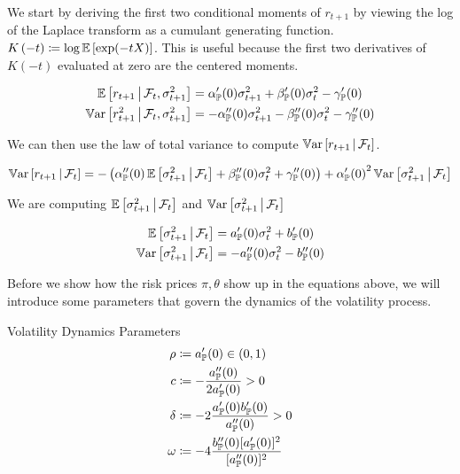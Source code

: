 \documentclass[11pt, letterpaper, twoside, final]{article}
\begin{document}
We start by deriving the first two conditional moments of $r_{t+1}$ by viewing the log of the Laplace transform as
a cumulant generating function.
$K\left(-t \right) \coloneqq \log \operatorname{\mathbb{E}}\left[\exp(-t X) \right]$. 
This is useful because the first two derivatives of $K(-t)$ evaluated at zero are the centered moments.

\begin{align}
    \operatorname{\mathbb{E}}\left[r_{t+1} \,\middle\vert\, \mathcal{F}_t, \sigma^2_{t+1}\right]  &= \alpha_{\mathbb{P}}'(0) \sigma^2_{t+1}  + \beta_{\mathbb{P}}'(0)
    \sigma^2_{t} - \gamma_{\mathbb{P}}'(0) \\
    \operatorname{\mathbb{V}ar}\left[r_{t+1}^2 \,\middle\vert\, \mathcal{F}_t, \sigma^2_{t+1}\right]  &= -\alpha_{\mathbb{P}}''(0) \sigma^2_{t+1}  -
    \beta_{\mathbb{P}}''(0) \sigma^2_{t} - \gamma_{\mathbb{P}}''(0)
\end{align}

We can then use the law of total variance to compute $\operatorname{\mathbb{V}ar}\left[r_{t+1} \,\middle\vert\, \mathcal{F}_t\right]$.

\begin{equation}
    \operatorname{\mathbb{V}ar}\left[r_{t+1} \,\middle\vert\, \mathcal{F}_t\right]  = -\left( \alpha_{\mathbb{P}}''(0) \operatorname{\mathbb{E}} \left[\sigma^2_{t+1} \,\middle\vert\, \mathcal{F}_t \right]
    + \beta_{\mathbb{P}}''(0) \sigma^2_{t} + \gamma_{\mathbb{P}}''(0)\right) + {\alpha_{\mathbb{P}}'(0)}^2 \operatorname{\mathbb{V}ar}\left[\sigma^2_{t+1}
    \,\middle\vert\, \mathcal{F}_{t} \right]
\end{equation}

We are computing $\operatorname{\mathbb{E}}\left[\sigma^2_{t+1} \,\middle\vert\, \mathcal{F}_t\right]$ and $\operatorname{\mathbb{V}ar}\left[\sigma^2_{t+1} \,\middle\vert\,
\mathcal{F}_t\right]$


\begin{align}
    \operatorname{\mathbb{E}}\left[\sigma^2_{t+1} \,\middle\vert\, \mathcal{F}_t \right]  &= a_{\mathbb{P}}'(0) \sigma^2_{t}  + b_{\mathbb{P}}'(0) \\
    \operatorname{\mathbb{V}ar}\left[\sigma^2_{t+1} \,\middle\vert\, \mathcal{F}_t \right]  &= -a_{\mathbb{P}}''(0) \sigma^2_{t}  - b_{\mathbb{P}}''(0) 
\end{align}

Before we show how the risk prices $\pi, \theta$ show up in the equations above, we will introduce some parameters
that govern the dynamics of the volatility process.


\begin{defn}{Volatility Dynamics Parameters}
    \begin{align}
        \rho &\coloneqq a_{\mathbb{P}}'(0) \in (0,1) \\
        c &\coloneqq - \frac{a_{\mathbb{P}}''(0)}{2 a_{\mathbb{P}}'(0)} > 0 \\
        \delta &\coloneqq -2 \frac{a_{\mathbb{P}}'(0) b_{\mathbb{P}}'(0)}{a_{\mathbb{P}}''(0)} > 0 \\
        \omega &\coloneqq -4 \frac{b_{\mathbb{P}}''(0) [a_{\mathbb{P}}'(0)]^2}{[a_{\mathbb{P}}''(0)]^2}
    \end{align}
\end{defn}
\end{document}
